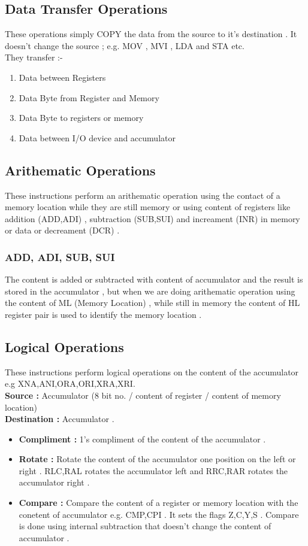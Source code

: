 \documentclass[14pt]{article}
\begin{document}
\subsection{Data Transfer Operations}
These operations simply COPY the data from the source to it's destination . It doesn't change the source ; e.g. MOV , MVI , LDA and STA etc.\\
They transfer :-
\begin{enumerate}
\item{Data between Registers}
\item{Data Byte from Register and Memory}
\item{Data Byte to registers or memory}
\item{Data between I/O device and accumulator}
\end{enumerate}

\subsection{Arithematic Operations}
These instructions perform an arithematic operation using the contact of a memory location while they are still memory or using content of registers like addition (ADD,ADI) , subtraction (SUB,SUI) and increament (INR) in memory or data or decreament (DCR) .
\subsubsection{ADD, ADI, SUB, SUI}
The content is added or subtracted with content of accumulator and the result is stored in the accumulator , but when we are doing arithematic operation using the content of ML (Memory Location) , while still in memory the content of HL register pair is used to identify the memory location .

\subsection{Logical Operations}
These instructions perform logical operations on the content of the accumulator e.g XNA,ANI,ORA,ORI,XRA,XRI.\\
\textbf{Source :} Accumulator (8 bit no. / content of register / content of memory location)\\
\textbf{Destination :} Accumulator .
\begin{itemize}
\item{\textbf{Compliment :}} 1's compliment of the content of the accumulator .
\item{\textbf{Rotate :}} Rotate the content of the accumulator one position on the left or right . RLC,RAL rotates the accumulator left and RRC,RAR rotates the accumulator right .
\item{\textbf{Compare :}} Compare the content of a register or memory location with the conetent of accumulator e.g. CMP,CPI . It sets the flags Z,C,Y,S . Compare is done using internal subtraction that doesn't change the content of accumulator .
\end{itemize}
\end{document}
